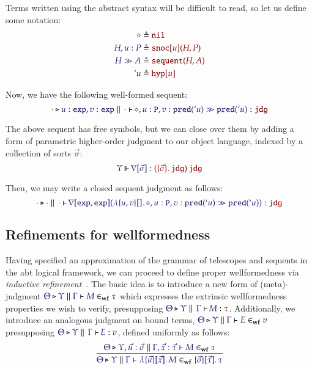\documentclass[11pt]{article}
\theoremstyle{definition}
\theoremstyle{remark}
\numberwithin{equation}{section}
\newcommand\SortExp{\mathtt{exp}}
\newcommand\IsWf[5]{%
  \IMode{#1}\triangleright%
  \IMode{#2}\parallel%
  \IMode{#3}\vdash%
  \IMode{#4}\in_{\mathbf{wf}}\IMode{#5}%
}
\begin{document}
Terms written using the abstract syntax will be difficult to read, so let us
define some notation:
\begin{align*}
  \IMode{\diamond}
&
  \triangleq \OMode{\OpNil}
\\
  \IMode{H, u:P}
&
  \triangleq \OMode{
    \App{\OpSnoc{u}}{H, P}
  }
\\
  \IMode{H\gg A}
&
  \triangleq \OMode{
    \App{\OpSequent}{
      H, A
    }
  }
\\
  \IMode{`u}
&
  \triangleq \OMode{\OpHyp{u}}
\end{align*}

Now, we have the following well-formed sequent:
\[
  \IsAbt{\cdot}{
    u:\SortExp,
    v:\SortExp
  }{\cdot}{
    \diamond,u:\mathtt{P},v:\App{\mathtt{pred}}{`u}
    \gg
    \App{\mathtt{pred}}{`u}
  }{\SortJdg}
\]

\newcommand\OpNabla[1]{\nabla[#1]}

The above sequent has free symbols, but we can close over them by adding a form
of parametric higher-order judgment to our object language, indexed by a
collection of sorts $\vec{\sigma}$:
\[
  \IsOperator{\Upsilon}{\OpNabla{\vec{\sigma}}}{
    \MkArity{
      \MkValence{\vec{\sigma}}{}{\SortJdg}
    }{\SortJdg}
  }
\]

Then, we may write a closed sequent judgment as follows:
\[
  \IsAbt{\cdot}{\cdot}{\cdot}{
    \App{\OpNabla{\SortExp,\SortExp}}{
      \MkBTm{u,v}{}{
        \diamond,u:\mathtt{P},v:\App{\mathtt{pred}}{`u}
        \gg
        \App{\mathtt{pred}}{`u}
      }
    }
  }{\SortJdg}
\]

\subsection{Refinements for wellformedness}

Having specified an approximation of the grammar of telescopes and sequents in
the abt logical framework, we can proceed to define proper wellformedness via
\emph{inductive refinement}~\cite{harper:2016}. The basic idea is to introduce a
new form of (meta)-judgment $\IsWf{\Theta}{\Upsilon}{\Gamma}{M}{\tau}$ which
expresses the extrinsic wellformedness properties we wish to verify,
presupposing $\IsAbt{\Theta}{\Upsilon}{\Gamma}{M}{\tau}$. Additionally, we
introduce an analogous judgment on bound terms,
$\IsWf{\Theta}{\Upsilon}{\Gamma}{E}{v}$ presupposing
$\IsAbt{\Theta}{\Upsilon}{\Gamma}{E}{v}$, defined uniformly as follows:
\[
  \infer{
    \IsWf{\Theta}{\Upsilon}{\Gamma}{
      \MkBTm{\vec{u}}{\vec{x}}{M}
    }{
      \MkValence{\vec{\sigma}}{\vec{\tau}}{\tau}
    }
  }{
    \IsWf{\Theta}{\Upsilon,\vec{u}:\vec{\sigma}}{\Gamma,\vec{x}:\vec{\tau}}{M}{\tau}
  }
\]
\end{document}
